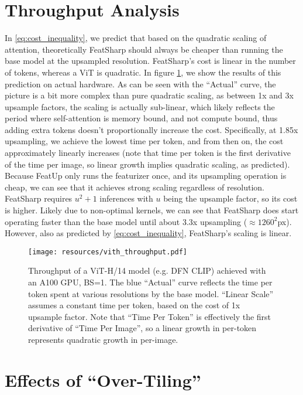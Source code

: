 \section{Throughput Analysis}

In \eqref{eq:cost_inequality}, we predict that based on the quadratic scaling of attention, theoretically FeatSharp should always be cheaper than running the base model at the upsampled resolution. FeatSharp's cost is linear in the number of tokens, whereas a ViT is quadratic. In figure \ref{fig:vith_throughput}, we show the results of this prediction on actual hardware. As can be seen with the ``Actual'' curve, the picture is a bit more complex than pure quadratic scaling, as between 1x and 3x upsample factors, the scaling is actually sub-linear, which likely reflects the period where self-attention is memory bound, and not compute bound, thus adding extra tokens doesn't proportionally increase the cost. Specifically, at 1.85x upsampling, we achieve the lowest time per token, and from then on, the cost approximately linearly increases (note that time per token is the first derivative of the time per image, so linear growth implies quadratic scaling, as predicted). Because FeatUp only runs the featurizer once, and its upsampling operation is cheap, we can see that it achieves strong scaling regardless of resolution. FeatSharp requires $u^2 + 1$ inferences with $u$ being the upsample factor, so its cost is higher. Likely due to non-optimal kernels, we can see that FeatSharp does start operating faster than the base model until about 3.3x upsampling ($\approx 1260^2$px). However, also as predicted by \eqref{eq:cost_inequality}, FeatSharp's scaling is linear.

\begin{figure}[h]
    \centering
    \texttt{[image: resources/vith\_throughput.pdf]}
    \caption{Throughput of a ViT-H/14 model (e.g. DFN CLIP) achieved with an A100 GPU, BS=1. The blue ``Actual'' curve reflects the time per token spent at various resolutions by the base model. ``Linear Scale'' assumes a constant time per token, based on the cost of 1x upsample factor. Note that ``Time Per Token'' is effectively the first derivative of ``Time Per Image'', so a linear growth in per-token represents quadratic growth in per-image.}
    \label{fig:vith_throughput}
\end{figure}

\section{Effects of ``Over-Tiling''}\label{sec:apdx:overtiling}

